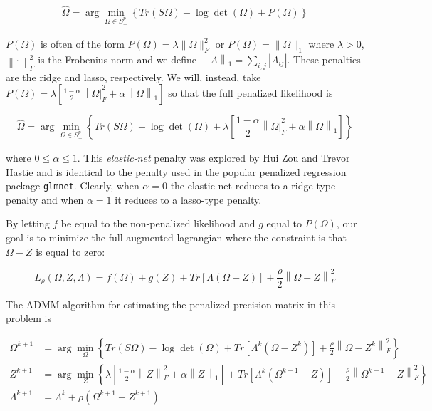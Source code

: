 \documentclass[12pt,]{book}
\theoremstyle{definition}
\theoremstyle{definition}
\theoremstyle{definition}
\theoremstyle{remark}
\begin{document}
\[ \hat{\Omega} = \arg\min_{\Omega \in S_{+}^{p}}\left\{ Tr\left(S\Omega\right) - \log \det\left(\Omega \right) + P\left( \Omega \right) \right\} \]

\(P\left( \Omega \right)\) is often of the form
\(P\left(\Omega \right) = \lambda\|\Omega \|_{F}^{2}\) or
\(P\left(\Omega \right) = \|\Omega\|_{1}\) where \(\lambda > 0\),
\(\left\|\cdot \right\|_{F}^{2}\) is the Frobenius norm and we define
\(\left\|A \right\|_{1} = \sum_{i, j} \left| A_{ij} \right|\). These
penalties are the ridge and lasso, respectively. We will, instead, take
\(P\left( \Omega \right) = \lambda\left[\frac{1 - \alpha}{2}\left\| \Omega \right|_{F}^{2} + \alpha\left\| \Omega \right\|_{1} \right]\)
so that the full penalized likelihood is

\[ \hat{\Omega} = \arg\min_{\Omega \in S_{+}^{p}}\left\{ Tr\left(S\Omega\right) - \log \det\left(\Omega \right) + \lambda\left[\frac{1 - \alpha}{2}\left\| \Omega \right|_{F}^{2} + \alpha\left\| \Omega \right\|_{1} \right] \right\} \]

where \(0 \leq \alpha \leq 1\). This \emph{elastic-net} penalty was
explored by Hui Zou and Trevor Hastie \citep{zou2005regularization} and
is identical to the penalty used in the popular penalized regression
package \texttt{glmnet}. Clearly, when \(\alpha = 0\) the elastic-net
reduces to a ridge-type penalty and when \(\alpha = 1\) it reduces to a
lasso-type penalty.

By letting \(f\) be equal to the non-penalized likelihood and \(g\)
equal to \(P\left( \Omega \right)\), our goal is to minimize the full
augmented lagrangian where the constraint is that \(\Omega - Z\) is
equal to zero:

\[ L_{\rho}(\Omega, Z, \Lambda) = f\left(\Omega\right) + g\left(Z\right) + Tr\left[\Lambda\left(\Omega - Z\right)\right] + \frac{\rho}{2}\left\|\Omega - Z\right\|_{F}^{2} \]

The ADMM algorithm for estimating the penalized precision matrix in this
problem is

\begin{align}
  \Omega^{k + 1} &= \arg\min_{\Omega}\left\{ Tr\left(S\Omega\right) - \log\det\left(\Omega\right) + Tr\left[\Lambda^{k}\left(\Omega - Z^{k}\right)\right] + \frac{\rho}{2}\left\| \Omega - Z^{k} \right\|_{F}^{2} \right\} \\
  Z^{k + 1} &= \arg\min_{Z}\left\{ \lambda\left[ \frac{1 - \alpha}{2}\left\| Z \right\|_{F}^{2} + \alpha\left\| Z \right\|_{1} \right] + Tr\left[\Lambda^{k}\left(\Omega^{k + 1} - Z\right)\right] + \frac{\rho}{2}\left\| \Omega^{k + 1} - Z \right\|_{F}^{2} \right\} \\
  \Lambda^{k + 1} &= \Lambda^{k} + \rho\left( \Omega^{k + 1} - Z^{k + 1} \right)
\end{align}
\end{document}
